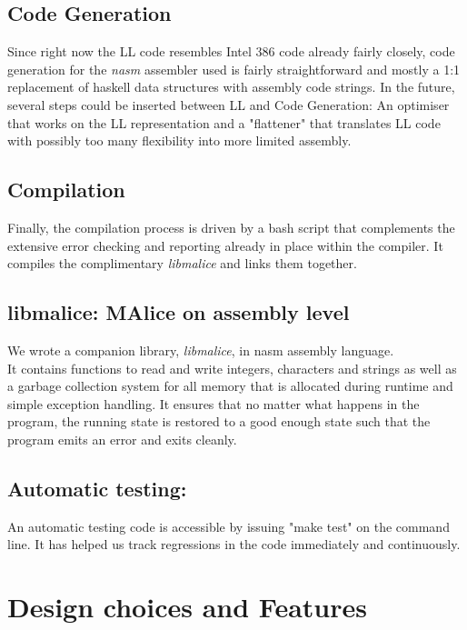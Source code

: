 \documentclass[a4paper]{article}
\begin{document}
\subsection{Code Generation}

Since right now the LL code resembles Intel 386 code already fairly closely,
code generation for the \emph{nasm} assembler used is fairly straightforward
and mostly a 1:1 replacement of haskell data structures with assembly code strings.
In the future, several steps could be inserted between LL and Code Generation:
An optimiser that works on the LL representation and a "flattener" that
translates LL code with possibly too many flexibility into more limited
assembly.


\subsection{Compilation}

Finally, the compilation process is driven by a bash script that complements
the extensive error checking and reporting already in place within the compiler.
It compiles the complimentary \emph{libmalice} and links them together.


\subsection{libmalice: MAlice on assembly level}

We wrote a companion library, \emph{libmalice}, in nasm assembly language.\\
It contains functions to read and write integers, characters and strings
as well as a garbage collection system for all memory that is allocated
during runtime and simple exception handling. It ensures that no matter what
happens in the program, the running state is restored to a good enough state
such that the program emits an error and exits cleanly.


\subsection{Automatic testing:}
An automatic testing code is accessible by issuing "make test" on the command line.
It has helped us track regressions in the code immediately and continuously.


\section{Design choices and Features}
\end{document}
